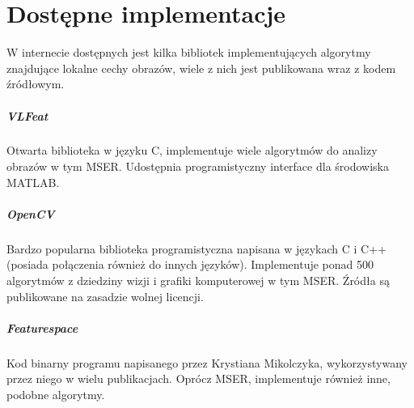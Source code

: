 
\section{Dostępne implementacje}

W internecie dostępnych jest kilka bibliotek implementujących algorytmy
znajdujące lokalne cechy obrazów, wiele z nich jest publikowana wraz z kodem
źródłowym.

\subparagraph{VLFeat \cite{vlfeat}}

Otwarta biblioteka w języku C, implementuje wiele algorytmów do analizy obrazów
w tym MSER. Udostępnia programistyczny interface dla środowiska MATLAB.

\subparagraph{OpenCV \cite{opencv}}

Bardzo popularna biblioteka programistyczna napisana w językach C i C++
(posiada połączenia również do innych języków). Implementuje ponad 500
algorytmów z dziedziny wizji i grafiki komputerowej w tym MSER. Źródła są
publikowane na zasadzie wolnej licencji.

\subparagraph{Featurespace \cite{featurespace}}

Kod binarny programu napisanego przez Krystiana Mikolczyka, wykorzystywany przez
niego w wielu publikacjach. Oprócz MSER, implementuje również inne, podobne
algorytmy.
